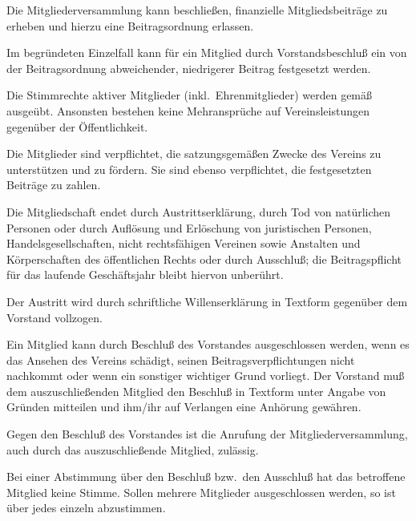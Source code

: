 \documentclass[draft]{scrartcl}
\begin{document}
\begin{contract}

Die Mitgliederversammlung kann beschließen, finanzielle Mitgliedsbeiträge zu
erheben und hierzu eine Beitragsordnung erlassen.

Im begründeten Einzelfall kann für ein Mitglied durch Vorstandsbeschluß ein
von der Beitragsordnung abweichender, niedrigerer Beitrag festgesetzt werden.


Die Stimmrechte aktiver Mitglieder (inkl.\ Ehrenmitglieder) werden gemäß
~ ausgeübt. Ansonsten bestehen
keine Mehransprüche auf Vereinsleistungen gegenüber der Öffentlichkeit.

Die Mitglieder sind verpflichtet, die satzungsgemäßen Zwecke des Vereins zu
unterstützen und zu fördern. Sie sind ebenso verpflichtet, die festgesetzten
Beiträge zu zahlen.


Die Mitgliedschaft endet durch Austrittserklärung, durch Tod von natürlichen
Personen oder durch Auf\/lösung und Erlöschung von juristischen Personen,
Handelsgesellschaften, nicht rechtsfähigen Vereinen sowie Anstalten und
Körperschaften des öffentlichen Rechts oder durch Ausschluß; die
Beitragspflicht für das laufende Geschäftsjahr bleibt hiervon unberührt.

Der Austritt wird durch schriftliche Willenserklärung in Textform
ge\-gen\-über dem Vorstand vollzogen.


Ein Mitglied kann durch Beschluß des Vorstandes ausgeschlossen werden, wenn es
das Ansehen des Vereins schädigt, seinen Beitragsverpflichtungen nicht
nachkommt oder wenn ein sonstiger wichtiger Grund vorliegt. Der Vorstand muß
dem auszuschließenden Mitglied den Beschluß in Textform unter Angabe von
Gründen mitteilen und ihm/ihr auf Verlangen eine Anhörung gewähren.

Gegen den Beschluß des Vorstandes ist die Anrufung der Mitgliederversammlung,
auch durch das auszuschließende Mitglied, zu\-läs\-sig.

Bei einer Abstimmung über den Beschluß bzw.\ den Ausschluß hat das betroffene
Mitglied keine Stimme. Sollen mehrere Mitglieder ausgeschlossen werden, so ist
über jedes einzeln abzustimmen.



\end{contract}
\end{document}
